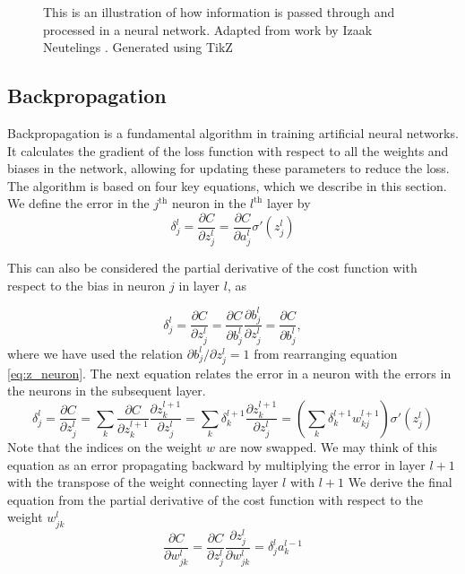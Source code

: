 \begin{figure}[H]
    \centering
    
    \caption[Neural Network with equations]{This is an illustration of how information is passed through and processed in a neural network.
    Adapted from work by Izaak Neutelings \cite{tikznet}.
    Generated using TikZ \cite{tikz}}
    \label{fig:nnfig}
\end{figure}




\subsection{Backpropagation}
Backpropagation\cite{backprop_original} is a fundamental algorithm in training artificial neural networks.
It calculates the gradient of the loss function with respect to all the weights and biases in the network,
allowing for updating these parameters to reduce the loss.
The algorithm is based on four key equations, which we describe in this section.\\

We define the error in the $j^\text{th}$ neuron in the $l^\text{th}$ layer by
\begin{equation}\label{eq:bp1} 
    \delta_j^l = \frac{\partial C}{\partial z_j^l} = \frac{\partial C}{\partial a_j^l} \sigma '(z_j^l)
\end{equation}

This can also be considered the partial derivative of the cost function with respect to the bias in neuron $j$ in layer $l$, as 

\begin{equation}\label{eq:bp2}
    \delta_j^l = \frac{\partial C}{\partial z_j^l} = \frac{\partial C}{\partial b_j^l} \frac{\partial b_j^l }{\partial z_j^l} = \frac{\partial C}{\partial b_j^l},
\end{equation}
where we have used the relation $\partial b_j^l / \partial z_j^l = 1$ from rearranging equation \eqref{eq:z_neuron}.
The next equation relates the error in a neuron with the errors in the neurons in the subsequent layer.
\begin{equation}\label{eq:bp3}
    \delta_j^l = \frac{\partial C}{\partial z_j^l} = \sum_k \frac{\partial C}{\partial z_k^{l+1}} \frac{\partial z_k^{l+1}}{\partial z_j^l} = \sum_k \delta_k^{l+1} \frac{\partial z_k^{l+1}}{\partial z_j^l} = \left( \sum_k \delta_k^{l+1} w_{kj}^{l+1} \right) \sigma '(z_j^l)
\end{equation}
Note that the indices on the weight $w$ are now swapped.
We may think of this equation as an error propagating backward by multiplying the error in layer $l+1$ with the transpose of the weight connecting layer $l$ with $l+1$
We derive the final equation from the partial derivative of the cost function with respect to the weight $w_{jk}^l$
\begin{equation}\label{eq:bp4}
    \frac{\partial C}{\partial w_{jk}^l} = \frac{\partial C}{\partial z_j^l} \frac{\partial z_j^l}{\partial w_{jk}^l} = \delta_j^l a_k^{l-1}
\end{equation}

